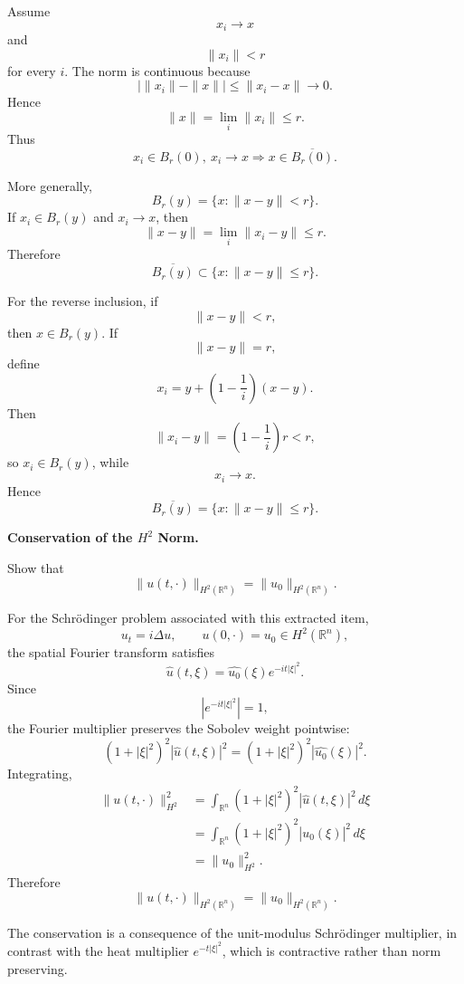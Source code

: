 \begin{solution}
Assume
\[
x_i\to x
\]
and
\[
\|x_i\|<r
\]
for every \(i\). The norm is continuous because
\[
\bigl|\|x_i\|-\|x\|\bigr|
\le
\|x_i-x\|\to0.
\]
Hence
\[
\|x\|
=
\lim_i\|x_i\|
\le r.
\]
Thus
\[
\boxed{
x_i\in B_r(0),\ x_i\to x
\Longrightarrow
x\in\overline{B_r(0)}.
}
\]

More generally,
\[
B_r(y)=\{x:\|x-y\|<r\}.
\]
If \(x_i\in B_r(y)\) and \(x_i\to x\), then
\[
\|x-y\|
=
\lim_i\|x_i-y\|
\le r.
\]
Therefore
\[
\overline{B_r(y)}
\subset
\{x:\|x-y\|\le r\}.
\]

For the reverse inclusion, if
\[
\|x-y\|<r,
\]
then \(x\in B_r(y)\). If
\[
\|x-y\|=r,
\]
define
\[
x_i
=
y+\left(1-\frac1i\right)(x-y).
\]
Then
\[
\|x_i-y\|
=
\left(1-\frac1i\right)r<r,
\]
so \(x_i\in B_r(y)\), while
\[
x_i\to x.
\]
Hence
\[
\boxed{
\overline{B_r(y)}
=
\{x:\|x-y\|\le r\}.
}
\]
\end{solution}


\begin{problem}[CP-II-0034]
\label{prob:cp-ii-0034}
\textbf{Conservation of the \(H^2\) Norm.}

\hspace*{1.5em}Show that
	\[
	\|u(t,\cdot)\|_{H^2(\mathbb{R}^n)} = \|u_0\|_{H^2(\mathbb{R}^n)}.
	\]
\end{problem}

\begin{solution}
For the Schrödinger problem associated with this extracted item,
\[
u_t=i\Delta u,
\qquad
u(0,\cdot)=u_0\in H^2(\mathbb R^n),
\]
the spatial Fourier transform satisfies
\[
\widehat u(t,\xi)
=
\widehat{u_0}(\xi)e^{-it|\xi|^2}.
\]
Since
\[
\left|e^{-it|\xi|^2}\right|=1,
\]
the Fourier multiplier preserves the Sobolev weight pointwise:
\[
(1+|\xi|^2)^2
|\widehat u(t,\xi)|^2
=
(1+|\xi|^2)^2
|\widehat{u_0}(\xi)|^2.
\]
Integrating,
\[
\begin{aligned}
\|u(t,\cdot)\|_{H^2}^2
&=
\int_{\mathbb R^n}
(1+|\xi|^2)^2
|\widehat u(t,\xi)|^2\,d\xi\\
&=
\int_{\mathbb R^n}
(1+|\xi|^2)^2
|\widehat{u_0}(\xi)|^2\,d\xi\\
&=
\|u_0\|_{H^2}^2.
\end{aligned}
\]
Therefore
\[
\boxed{
\|u(t,\cdot)\|_{H^2(\mathbb R^n)}
=
\|u_0\|_{H^2(\mathbb R^n)}.
}
\]

The conservation is a consequence of the unit-modulus Schrödinger multiplier, in contrast
with the heat multiplier \(e^{-t|\xi|^2}\), which is contractive rather than norm preserving.
\end{solution}


